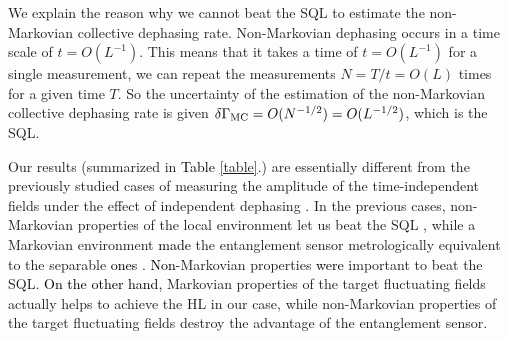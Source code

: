 \documentclass[prl,twocolumn,superscriptaddress]{revtex4}
\begin{document}
 We explain the reason why we cannot beat the SQL to estimate the
 non-Markovian collective dephasing rate.
 Non-Markovian dephasing occurs in a time scale of $t=O(L^{-1})$.
 This means that
 it takes a time of  $t=O(L^{-1})$ for a single measurement, we can
 repeat the measurements $N=T/t=O(L)$ times for a given time
 $T$. So the uncertainty of the estimation of
 the non-Markovian collective dephasing rate is given $\delta \Gamma
 _{\rm{MC}}=O(N^{-1/2})=O(L^{-1/2})$, which is the SQL.
 
 Our results (summarized in \textcolor{black}{Table} \ref{table}.)
 are essentially different
 from the previously studied cases of measuring the amplitude of
 the time-independent fields under the effect of independent dephasing
 \cite{huelga1997improvement,matsuzaki2011magnetic,chin2012quantum,tanaka2015proposed}.
 In the previous cases, non-Markovian properties of the local
 environment let us beat the SQL
 \cite{matsuzaki2011magnetic,chin2012quantum,tanaka2015proposed}, while
a Markovian environment
\textcolor{black}{made} the entanglement sensor metrologically
 equivalent to the separable
 \textcolor{black}{ones}
 \cite{huelga1997improvement}.
 \textcolor{black}{Non}-Markovian properties
 \textcolor{black}{were}
 important to beat the SQL.
 \textcolor{black}{On the other hand,}
 Markovian properties
 of the target fluctuating fields actually helps to achieve the HL in
 our case,
 while non-Markovian properties of the target fluctuating fields
 destroy the
 advantage of the entanglement sensor. 
\end{document}

